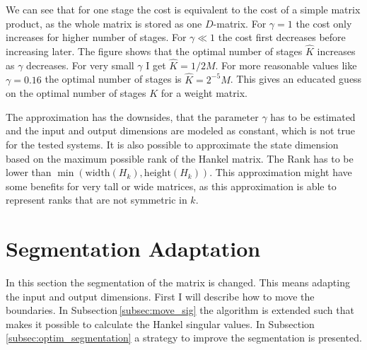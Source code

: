 \documentclass[doctype=mastersthesis,BCOR=15mm,biblatex]{ldvbook}%
\begin{document}
We can see that for one stage the cost is equivalent to the cost of a simple matrix product, as the whole matrix is stored as one $D$-matrix.
For $\gamma = 1$ the cost only increases for higher number of stages. 
For $\gamma \ll 1$ the cost first decreases before increasing later.
The figure shows that the optimal number of stages $\hat{K}$ increases as $\gamma$ decreases.
For very small $\gamma$ I get $\hat{K} = 1/2 M$.
For more reasonable values like $\gamma=0.16$ the optimal number of stages is $\hat{K}=2^{-5}M$. 
This gives an educated guess on the optimal number of stages $K$ for a weight matrix.

The approximation has the downsides, that the parameter $\gamma$ has to be estimated
and the input and output dimensions are modeled as constant, which is not true for the tested systems.
It is also possible to approximate the state dimension based on the maximum possible rank of the Hankel matrix.
The Rank has to be lower than $\min(\text{width}(H_k),\text{height}(H_k))$.
This approximation might have some benefits for very tall or wide matrices, as this approximation is able to represent ranks that are not symmetric in $k$. 


\section{Segmentation Adaptation}\label{sec:Segmentation}

In this section the segmentation of the matrix is changed. 
This means adapting the input and output dimensions. 
First I will describe how to move the boundaries.
In Subsection\,\ref{subsec:move_sig} the algorithm is extended such that makes it possible to calculate the Hankel singular values.
In Subsection\,\ref{subsec:optim_segmentation} a strategy to improve the segmentation is presented.
\end{document}

